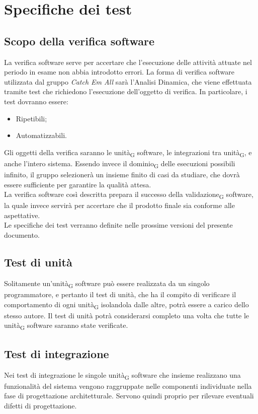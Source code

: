 \section{Specifiche dei test}

\subsection{Scopo della verifica software}
La verifica software serve per accertare che l'esecuzione delle attività attuate nel periodo in esame non abbia introdotto errori. La forma di verifica software utilizzata dal gruppo \textit{Catch Em All} sarà l'Analisi Dinamica, che viene effettuata tramite test che richiedono l'esecuzione dell'oggetto di verifica. In particolare, i test dovranno essere:
\begin{itemize}
	\item Ripetibili;
	\item Automatizzabili.
\end{itemize}
Gli oggetti della verifica saranno le unità\textsubscript{G} software, le integrazioni tra unità\textsubscript{G}, e anche l'intero sistema. Essendo invece il dominio\textsubscript{G} delle esecuzioni possibili infinito, il gruppo selezionerà un insieme finito di casi da studiare, che dovrà essere sufficiente per garantire la qualità attesa.\\
La verifica software così descritta prepara il successo della validazione\textsubscript{G} software, la quale invece servirà per accertare che il prodotto finale sia conforme alle aspettative.\\
Le specifiche dei test verranno definite nelle prossime versioni del presente documento.
\subsection{Test di unità}
Solitamente un'unità\textsubscript{G} software può essere realizzata da un singolo programmatore, e pertanto il test di unità, che ha il compito di verificare il comportamento di ogni unità\textsubscript{G} isolandola dalle altre, potrà essere a carico dello stesso autore. Il test di unità potrà considerarsi completo una volta che tutte le unità\textsubscript{G} software saranno state verificate.

\subsection{Test di integrazione}
Nei test di integrazione le singole unità\textsubscript{G} software che insieme realizzano una funzionalità del sistema vengono raggruppate nelle componenti individuate nella fase di progettazione architetturale. Servono quindi proprio per rilevare eventuali difetti di progettazione.

